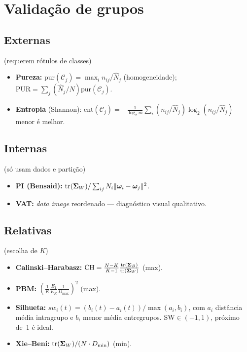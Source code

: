 \section{Validação de grupos}

\subsection{Externas} (requerem rótulos de classes)
\begin{itemize}[leftmargin=1.2cm]
  \item \textbf{Pureza:} $\mathrm{pur}(\mathcal{C}_j)=\max_i n_{ij}/\hat N_j$ (homogeneidade); $\mathrm{PUR}=\sum_j(\hat N_j/N)\mathrm{pur}(\mathcal{C}_j)$.
  \item \textbf{Entropia} (Shannon): $\mathrm{ent}(\mathcal{C}_j)=-\frac{1}{\log_2 m}\sum_i (n_{ij}/\hat N_j)\log_2(n_{ij}/\hat N_j)$ --- menor é melhor.
\end{itemize}

\subsection{Internas} (só usam dados e partição)
\begin{itemize}[leftmargin=1.2cm]
  \item \textbf{PI (Bensaid):} $\operatorname{tr}(\boldsymbol\Sigma_W)/\sum_{ij}N_i\|\boldsymbol\omega_i-\boldsymbol\omega_j\|^2$.
  \item \textbf{VAT:} \emph{data image} reordenado --- diagnóstico visual qualitativo.
\end{itemize}

\subsection{Relativas} (escolha de $K$)
\begin{itemize}[leftmargin=1.2cm]
  \item \textbf{Calinski--Harabasz:}
        $\mathrm{CH}=\frac{N-K}{K-1}\frac{\operatorname{tr}(\boldsymbol\Sigma_B)}{\operatorname{tr}(\boldsymbol\Sigma_W)}$ (max).
  \item \textbf{PBM:} $(\frac{1}{K}\frac{E_1}{E_K}\frac{1}{D_{\max}})^2$ (max).
  \item \textbf{Silhueta:} $sw_i(t)=(b_i(t)-a_i(t))/\max(a_i,b_i)$, com $a_i$ distância média intragrupo e $b_i$ menor média entregrupos. $\mathrm{SW}\in(-1,1)$, próximo de~1 é ideal.
  \item \textbf{Xie--Beni:} $\operatorname{tr}(\boldsymbol\Sigma_W)/(N\cdot D_{\min})$ (min).
\end{itemize}

